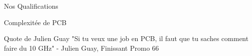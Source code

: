 \begin{frame}{Nos Qualifications}
\end{frame}

\begin{frame}{Complexitée de PCB}
    \vspace{-5pt}
\end{frame}

\begin{frame}{Quote de Julien Guay}
    "Si tu veux une job en PCB, il faut que tu saches comment faire du 10 GHz" - Julien Guay, Finissant Promo 66
\end{frame}

